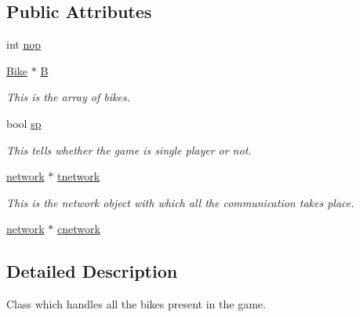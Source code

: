 \subsection*{Public Attributes}
\begin{DoxyCompactItemize}
\item 
int \hyperlink{class_tron_ad177bcd737ae99884f7dee2be6c92a72}{nop}
\item 
\hypertarget{class_tron_af442208c79ad4b4832758ce252a19c24}{\hyperlink{class_bike}{Bike} $\ast$ \hyperlink{class_tron_af442208c79ad4b4832758ce252a19c24}{B}}\label{class_tron_af442208c79ad4b4832758ce252a19c24}

\begin{DoxyCompactList}\small\item\em This is the array of bikes. \end{DoxyCompactList}\item 
\hypertarget{class_tron_a4bcebf4ebdfed517e1b2a2f83547ab8c}{bool \hyperlink{class_tron_a4bcebf4ebdfed517e1b2a2f83547ab8c}{sp}}\label{class_tron_a4bcebf4ebdfed517e1b2a2f83547ab8c}

\begin{DoxyCompactList}\small\item\em This tells whether the game is single player or not. \end{DoxyCompactList}\item 
\hypertarget{class_tron_a64492a4e3ac9ec1ae221dc3fc47956c5}{\hyperlink{classnetwork}{network} $\ast$ \hyperlink{class_tron_a64492a4e3ac9ec1ae221dc3fc47956c5}{tnetwork}}\label{class_tron_a64492a4e3ac9ec1ae221dc3fc47956c5}

\begin{DoxyCompactList}\small\item\em This is the network object with which all the communication takes place. \end{DoxyCompactList}\item 
\hyperlink{classnetwork}{network} $\ast$ \hyperlink{class_tron_a9d1c7b1df7030845009908cf70c16e1a}{cnetwork}
\end{DoxyCompactItemize}


\subsection{Detailed Description}
Class which handles all the bikes present in the game. 

